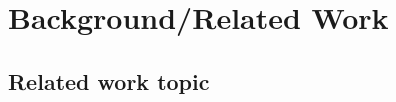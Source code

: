 \newpage
\section{Background/Related Work}

\lipsum[5]

\lipsum[5]

\lipsum[5]

\subsection{Related work topic}

\lipsum[5]

\lipsum[5]